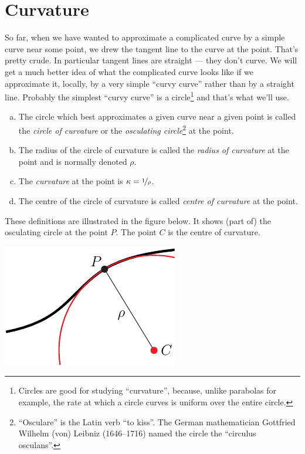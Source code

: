 \section{Curvature}\label{sec:curvature}
So far, when we have wanted to approximate a complicated curve by
a simple curve near some point, we drew the tangent line
to the curve at the point. That's pretty crude. In particular tangent
lines are straight --- they don't curve. We will get a much better idea
of what the complicated curve looks like if we approximate it, locally,
by a very simple ``curvy curve'' rather than by a straight line.  
Probably the simplest ``curvy curve'' is a circle\footnote{Circles are good
for studying ``curvature'', because, unlike parabolas for example, the rate
at which a circle curves is uniform over the entire circle.} 
and that's what we'll use.
\begin{defn}\label{def:curvature}
\begin{enumerate}[(a)]
\item 
The circle which best approximates a given curve near a given 
point is called the \emph{circle of curvature} or the 
\emph{osculating circle}\footnote{``Osculare'' is the Latin verb ``to kiss''.
The German mathematician Gottfried Wilhelm (von) Leibniz (1646--1716)
named the circle the ``circulus osculans''.} at the point.
\item
The radius of the circle of curvature is called the \emph{radius of curvature}
at the point and is normally denoted $\rho$.
\item
The \emph{curvature} at the point is $\kappa=\nicefrac{1}{\rho}$.
\item
The centre of the circle of curvature is called \emph{centre of curvature}
at the point.
\end{enumerate}
\end{defn}
\noindent
These definitions are illustrated in the figure below. It shows (part of)
the osculating circle at the point $P$. The point $C$ is the centre of
curvature. 
\begin{efig}
\begin{center}
     \includegraphics{curvatureDef.pdf}
\end{center}
\end{efig}


